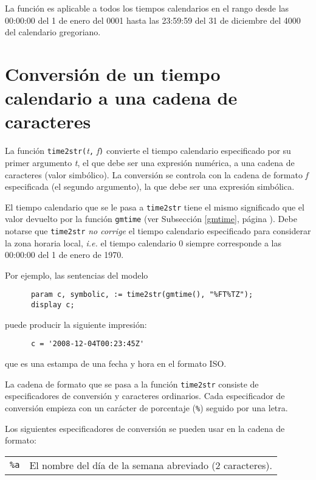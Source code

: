 \documentclass[11pt,spanish]{report}
\begin{document}
La función {} es aplicable a todos los tiempos calendarios en el rango desde las 00:00:00 del 1 de enero del 0001 hasta las 23:59:59 del 31 de diciembre del 4000 del calendario gregoriano.

\section{Conversión de un tiempo calendario a una cadena de caracteres}
\label{time2str}

La función {\tt time2str(}{\it t}{\tt,} {\it f}{\tt)} convierte el tiempo calendario especificado por su primer argumento {\it t}, el que debe ser una expresión numérica, a una cadena de caracteres (valor simbólico). La conversión se controla con la cadena de formato {\it f} especificada (el segundo argumento), la que debe ser una expresión simbólica.

El tiempo calendario que se le pasa a {\tt time2str} tiene el mismo significado que el valor devuelto por la función {\tt gmtime} (ver Subsección \ref{gmtime}, página \pageref{gmtime}). Debe notarse que {\tt time2str} {\it no corrige} el tiempo calendario especificado para considerar la zona horaria local, {\it i.e.} el tiempo calendario 0 siempre corresponde a las 00:00:00 del 1 de enero de 1970.

Por ejemplo, las sentencias del modelo

\begin{verbatim}
      param c, symbolic, := time2str(gmtime(), "%FT%TZ");
      display c;
\end{verbatim}

\noindent puede producir la siguiente impresión:

\begin{verbatim}
      c = '2008-12-04T00:23:45Z'
\end{verbatim}

\noindent que es una estampa de una fecha y hora en el formato ISO.

La cadena de formato que se pasa a la función {\tt time2str} consiste de especificadores de conversión y caracteres ordinarios. Cada especificador de conversión empieza con un carácter de porcentaje ({\tt\%}) seguido por una letra.

Los siguientes especificadores de conversión se pueden usar en la cadena de formato:

\newpage

\begin{tabular}{@{}p{20pt}p{421.5pt}@{}}
{\tt\%a}&El nombre del día de la semana abreviado (2 caracteres).\\
\end{tabular}
\end{document}

